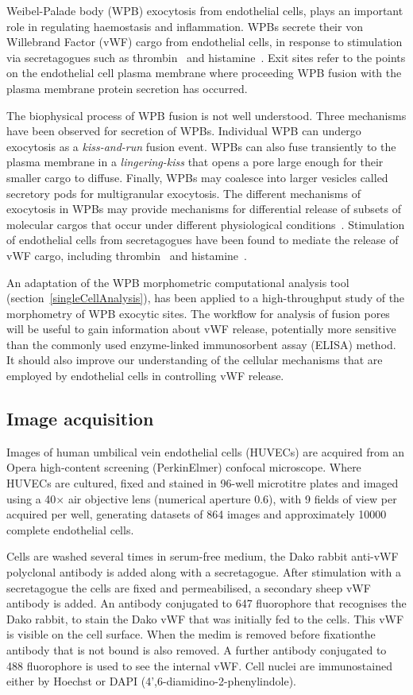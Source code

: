 Weibel-Palade body (WPB) exocytosis from endothelial cells, plays an important role in regulating haemostasis and inflammation. WPBs secrete their von Willebrand Factor (vWF) cargo from endothelial cells, in response to stimulation via secretagogues such as thrombin~\cite{Levine1982} and histamine~\cite{Hamilton1987}. Exit sites refer to the points on the endothelial cell plasma membrane where proceeding WPB fusion with the plasma membrane protein secretion has occurred.

The biophysical process of WPB fusion is not well understood. Three mechanisms have been observed for secretion of WPBs. Individual WPB can undergo exocytosis as a \emph{kiss-and-run} fusion event. WPBs can also fuse transiently to the plasma membrane in a \emph{lingering-kiss} that opens a pore large enough for their smaller cargo to diffuse. Finally, WPBs may coalesce into larger vesicles called secretory pods for multigranular exocytosis. The different mechanisms of exocytosis in WPBs may provide mechanisms for differential release of subsets of molecular cargos that occur under different physiological conditions~\cite{Valentijn2014}. Stimulation of endothelial cells from secretagogues have been found to mediate the release of vWF cargo, including thrombin~\cite{Levine1982} and histamine~\cite{Hamilton1987}.

An adaptation of the WPB morphometric computational analysis tool (section~\ref{singleCellAnalysis}), has been applied to a high-throughput study of the morphometry of WPB exocytic sites. The workflow for analysis of fusion pores will be useful to gain information about vWF release, potentially more sensitive than the commonly used enzyme-linked immunosorbent assay (ELISA) method. It should also improve our understanding of the cellular mechanisms that are employed by endothelial cells in controlling vWF release.

\subsection{Image acquisition}
Images of human umbilical vein endothelial cells (HUVECs) are acquired from an Opera high-content screening (PerkinElmer) confocal microscope. Where HUVECs are cultured, fixed and stained in 96-well microtitre plates and imaged using a 40$\times$ air objective lens (numerical aperture 0.6), with 9 fields of view per acquired per well, generating datasets of 864 images and approximately 10000 complete endothelial cells.

Cells are washed several times in serum-free medium, the Dako rabbit anti-vWF polyclonal antibody is added along with a secretagogue. After stimulation with a secretagogue the cells are fixed and permeabilised, a secondary sheep vWF antibody is added. An antibody conjugated to 647 fluorophore that recognises the Dako rabbit, to stain the Dako vWF that was initially fed to the cells. This vWF is visible on the cell surface. When the medim is removed before fixationthe antibody that is not bound is also removed. A further antibody conjugated to 488 fluorophore is used to see the internal vWF. Cell nuclei are immunostained either by Hoechst or DAPI (4',6-diamidino-2-phenylindole). 

